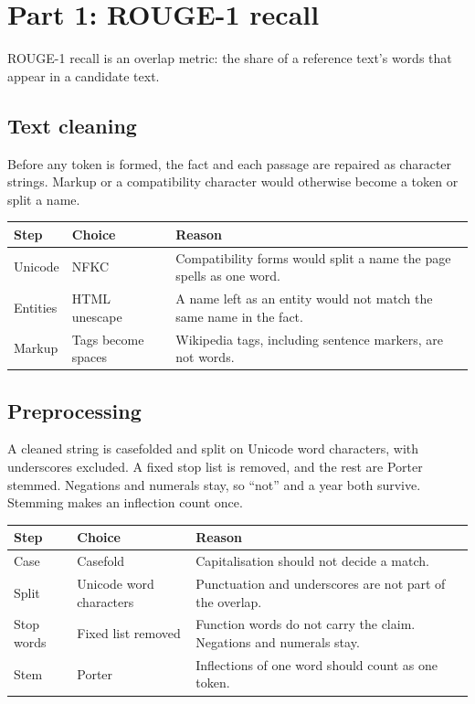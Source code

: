 ﻿\section{Part 1: ROUGE-1 recall}

ROUGE-1 recall is an overlap metric: the share of a reference text's words that appear in a candidate text.

\subsection{Text cleaning}

Before any token is formed, the fact and each passage are repaired as character strings. Markup or a compatibility character would otherwise become a token or split a name.

\begin{center}
\small
\begin{tabular}{@{}llp{7.4cm}@{}}
\toprule
Step & Choice & Reason \\
\midrule
Unicode & NFKC & Compatibility forms would split a name the page spells as one word. \\
Entities & HTML unescape & A name left as an entity would not match the same name in the fact. \\
Markup & Tags become spaces & Wikipedia tags, including sentence markers, are not words. \\
\bottomrule
\end{tabular}
\end{center}

\subsection{Preprocessing}

A cleaned string is casefolded and split on Unicode word characters, with underscores excluded. A fixed stop list is removed, and the rest are Porter stemmed. Negations and numerals stay, so ``not'' and a year both survive. Stemming makes an inflection count once.

\begin{center}
\small
\begin{tabular}{@{}llp{7.4cm}@{}}
\toprule
Step & Choice & Reason \\
\midrule
Case & Casefold & Capitalisation should not decide a match. \\
Split & Unicode word characters & Punctuation and underscores are not part of the overlap. \\
Stop words & Fixed list removed & Function words do not carry the claim. Negations and numerals stay. \\
Stem & Porter & Inflections of one word should count as one token. \\
\bottomrule
\end{tabular}
\end{center}

